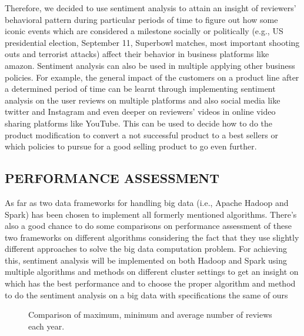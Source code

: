 Therefore, we decided to use sentiment analysis to attain an insight of reviewers’ behavioral pattern during particular periods of time to figure out how some iconic events which are considered a milestone socially or politically (e.g., US presidential election, September 11, Superbowl matches, most important shooting outs and terrorist attacks) affect their behavior in business platforms like amazon. Sentiment analysis can also be used in multiple applying other business policies. For example, the general impact of the customers on a product line after a determined period of time can be learnt through implementing sentiment analysis on the user reviews on multiple platforms and also social media like twitter and Instagram and even deeper on reviewers’ videos in online video sharing platforms like YouTube. This can be used to decide how to do the product modification to convert a not successful product to a best sellers or which policies to pursue for a good selling product to go even further. 

\subsection{PERFORMANCE ASSESSMENT}
As far as two data frameworks for handling big data (i.e., Apache Hadoop and Spark) has been chosen to implement all formerly mentioned algorithms. There’s also a good chance to do some comparisons on performance assessment of these two frameworks on different algorithms considering the fact that they use slightly different approaches to solve the big data computation problem. For achieving this, sentiment analysis will be implemented on both Hadoop and Spark using multiple algorithms and methods on different cluster settings to get an insight on which has the best performance and to choose the proper algorithm and method to do the sentiment analysis on a big data with specifications the same of ours


\begin{figure}
\caption{Comparison of maximum, minimum and average number of reviews each year.}
\label{fig:graph}
\end{figure}
